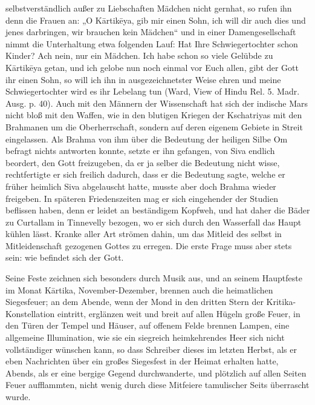 \documentclass{article}
\begin{document}
selbstverständlich außer zu Liebschaften Mädchen nicht gernhat, so rufen ihn denn die Frauen an: „O K\={a}rtik\={e}ya, gib mir einen Sohn, ich will dir auch dies und jenes darbringen, wir brauchen kein Mädchen“ und in einer Damengesellschaft nimmt die Unterhaltung etwa folgenden Lauf: Hat Ihre Schwiegertochter schon Kinder? Ach nein, nur ein Mädchen. Ich habe schon so viele Gelübde zu K\={a}rtik\={e}ya getan, und ich gelobe nun noch einmal vor Euch allen, gibt der Gott ihr einen Sohn, so will ich ihn in ausgezeichnetster Weise ehren und meine Schwiegertochter wird es ihr Lebelang tun (Ward, View of Hindu Rel. 5. Madr. Ausg. p. 40). Auch mit den Männern der Wissenschaft hat sich der indische Mars nicht bloß mit den Waffen, wie in den blutigen Kriegen der Kschatriyas mit den Brahmanen um die Oberherrschaft, sondern auf deren eigenem Gebiete in Streit eingelassen. Als Brahma von ihm über die Bedeutung der heiligen Silbe Om befragt nichts antworten konnte, setzte er ihn gefangen, von Siva endlich beordert, den Gott freizugeben, da er ja selber die Bedeutung nicht wisse, rechtfertigte er sich freilich dadurch, dass er die Bedeutung sagte, welche er früher heimlich Siva abgelauscht hatte, musste aber doch Brahma wieder freigeben. In späteren Friedenszeiten mag er sich eingehender der Studien beflissen haben, denn er leidet an beständigem Kopfweh, und hat daher die Bäder zu Curtallam in Tinnevelly bezogen, wo er sich durch den Wasserfall das Haupt kühlen lässt. Kranke aller Art strömen dahin, um das Mitleid des selbst in Mitleidenschaft gezogenen Gottes zu erregen. Die erste Frage muss aber stets sein: wie befindet sich der Gott.

Seine Feste zeichnen sich besonders durch Musik aus, und an seinem Hauptfeste im Monat K\={a}rtika, November-Dezember, brennen auch die heimatlichen Siegesfeuer; an dem Abende, wenn der Mond in den dritten Stern der Kritika-Konstellation eintritt, erglänzen weit und breit auf allen Hügeln große Feuer, in den Türen der Tempel und Häuser, auf offenem Felde brennen Lampen, eine allgemeine Illumination, wie sie ein siegreich heimkehrendes Heer sich nicht vollständiger wünschen kann, so dass Schreiber dieses im letzten Herbst, als er eben Nachrichten über ein großes Siegesfest in der Heimat erhalten hatte, Abends, als er eine bergige Gegend durchwanderte, und plötzlich auf allen Seiten Feuer aufflammten, nicht wenig durch diese Mitfeiere tamulischer Seits überrascht wurde.
\end{document}
